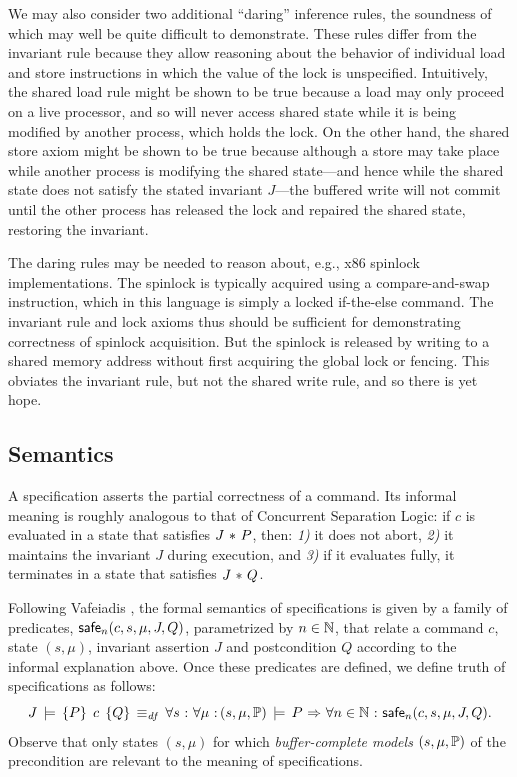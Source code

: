 \documentclass[11pt]{report}
\begin{document}
We may also consider two additional ``daring'' inference rules, the soundness of which may well be quite difficult to demonstrate. 
These rules differ from the invariant rule because they allow reasoning about the behavior of individual load and store instructions in which the value of the lock is unspecified. Intuitively, the shared load rule might be shown to be true because a load may only proceed on a live processor, and so will never access shared state while it is being modified by another process, which holds the lock. On the other hand, the shared store axiom might be shown to be true because although a store may take place while another process is modifying the shared state---and hence while the shared state does not satisfy the stated invariant $J$---the buffered write will not commit until the other process has released the lock and repaired the shared state, restoring the invariant.

The daring rules may be needed to reason about, e.g., x86 spinlock implementations. The spinlock is typically acquired using a compare-and-swap instruction, which in this language is simply a locked if-the-else command. The invariant rule and lock axioms thus should be sufficient for demonstrating correctness of spinlock acquisition. But the spinlock is released by writing to a shared memory address without first acquiring the global lock or fencing. This obviates the invariant rule, but not the shared write rule, and so there is yet hope. 

\subsection{Semantics}
\label{sec:specification-semantics}

A specification asserts the partial correctness of a command. Its informal meaning is roughly analogous to that of Concurrent Separation Logic: if $c$ is evaluated in a state that satisfies $J \operatorname{\,\ast\,} P$, then: \emph{1)} it does not abort, \emph{2)} it maintains the invariant $J$ during execution, and \emph{3)} if it evaluates fully, it terminates in a state that satisfies $J \operatorname{\,\ast\,} Q$. 

Following Vafeiadis \cite{V11}, the formal semantics of specifications is given by a family of predicates, $\mathsf{safe}_{n}(c,s,\mu,J,Q)$, parametrized by $n \in \mathbb{N}$, that relate a command $c$, state $(s,\mu)$, invariant assertion $J$ and postcondition $Q$ according to the informal explanation above. Once these predicates are defined, we define truth of specifications as follows: \[ J\,\models\,\left\lbrace P \right\rbrace\;c\;\left\lbrace Q \right\rbrace \operatorname{\;\equiv_{\mathit{df}}\;} \forall s \operatorname{\,:\,} \forall \mu \operatorname{\,:\,} (s,\mu,\mathbb{P})\,\models\, P \operatorname{\,\Rightarrow\,} \forall n \in \mathbb{N} \operatorname{\,:\,} \mathsf{safe}_{n}(c,s,\mu,J,Q).\] Observe that only states $(s,\mu)$ for which \emph{buffer-complete models} $(s,\mu,\mathbb{P})$ of the precondition are relevant to the meaning of specifications. 
\end{document}
